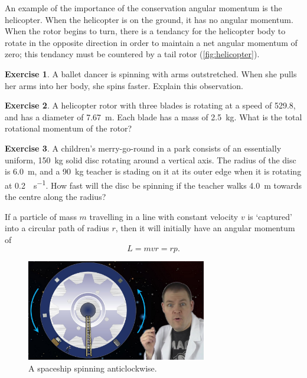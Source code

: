 \documentclass[a4paper]{amsbook}
\theoremstyle{definition}
\newtheorem{exercise}{Exercise}
\numberwithin{exercise}{chapter}
\numberwithin{exercise}{chapter}
\begin{document}
An example of the importance of the conservation angular momentum is the helicopter. When the helicopter is on the ground, it has no angular
momentum. When the rotor begins to turn, there is a tendancy for the helicopter body to rotate in the opposite direction in order to maintain
a net angular momentum of zero; this tendancy must be countered by a tail rotor (\cref{fig:helicopter}).

\begin{exercise}
  A ballet dancer is spinning with arms outstretched. When she pulls her arms into her body, she spins faster.
  Explain this observation.
\end{exercise}

\begin{exercise}
  A helicopter rotor with three blades is rotating at a speed of \SI{529.8}{\rpm}, and has a diameter
  of \SI{7.67}{\metre}. Each blade has a mass of \SI{2.5}{\kilo\gram}. What is the total rotational momentum of the rotor?
\end{exercise}

\begin{exercise}
  A children's merry-go-round in a park consists of an essentially uniform, \SI{150}{\kilo\gram} solid disc rotating around
  a vertical axis. The radius of the disc is \SI{6.0}{\metre}, and a \SI{90}{\kilo\gram} teacher is stading on it at its
  outer edge when it is rotating at \SI{0.2}{\revolution\per\second}. How fast will the disc be spinning if the teacher walks \SI{4.0}{\metre}
  towards the centre along the radius?
\end{exercise}

If a particle of mass $ m $ travelling in a line with constant velocity $ v $ is `captured' into a circular path of radius $ r $,
then it will initially have an angular momentum of
\begin{equation}
  L = mvr = rp.
\end{equation}

\begin{figure}
  \centering
  \includegraphics[width=0.7\textwidth]{spinning}
  \caption{A spaceship spinning anticlockwise.\label{fig:spinning}}
\end{figure}
\end{document}

